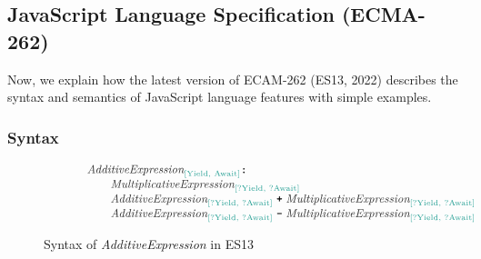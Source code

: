 \documentclass[acmsmall,review,screen]{acmart}
\newcommand{\esnt}[1]{\textit{\color{esnt}#1}}
\newcommand{\esparam}[1]{\text{\color{esparam}#1}}
\newcommand{\esntp}[2]{\esnt{#1}_\esparam{[#2]}}
\newcommand{\est}[1]{\textbf{\texttt{#1}}}
\begin{document}

\subsection{JavaScript Language Specification (ECMA-262)}\label{sec:ecma-262}

Now, we explain how the latest version of ECAM-262 (ES13, 2022) describes
the syntax and semantics of JavaScript language features with simple examples.


\subsubsection{Syntax}\label{sec:syntax}

\begin{figure}
  \centering
  \begin{subfigure}{\textwidth}
    \[
      \small
      \begin{array}{l}
        \esntp{AdditiveExpression}{Yield, Await} \est{:}\\

        \qquad \esntp{MultiplicativeExpression}{?Yield, ?Await}\\

        \qquad \esntp{AdditiveExpression}{?Yield, ?Await} \; \est{+} \;
        \esntp{MultiplicativeExpression}{?Yield, ?Await}\\

        \qquad \esntp{AdditiveExpression}{?Yield, ?Await} \; \est{-} \;
        \esntp{MultiplicativeExpression}{?Yield, ?Await}\\
      \end{array}
    \]
  \end{subfigure}
\vspace*{-.5em}
  \caption{Syntax of \esnt{AdditiveExpression} in ES13}
\vspace*{-.5em}
  \label{fig:add-syntax}
\end{figure}
\end{document}
